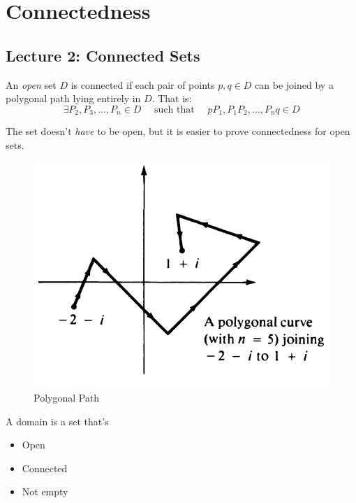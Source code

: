 \chapter{Connectedness}
\section{Lecture 2: Connected Sets}
\begin{definition}
    An \textit{open} set $D$ is connected if each pair of points $p, q \in D$ can be joined by a polygonal path lying entirely in $D$. That is:
    \[
        \exists P_2, P_3, \ldots, P_n \in D\quad  \text{ such that }\quad  pP_1, P_1P_2, \ldots, P_nq \in D\]
\end{definition}

\begin{remark}
    The set doesn't \textit{have} to be open, but it is easier to prove connectedness for open sets.
\end{remark}

\begin{figure}[H]
    \centering
    \includegraphics[scale=0.5]{LECTURE_2/poly.png}
    \caption{Polygonal Path}
    \label{fig:poly}
\end{figure}

\begin{definition}
    [Domain]
    A domain is a set that's
    \begin{itemize}
        \item Open
        \item Connected
        \item Not empty
    \end{itemize}
\end{definition}

